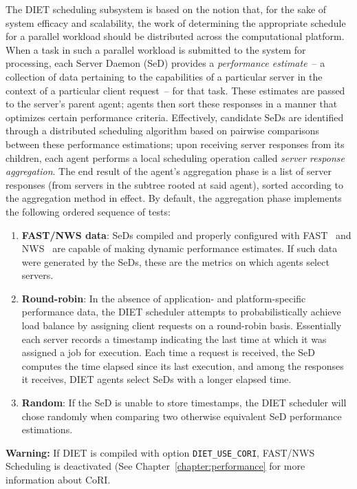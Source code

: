 The DIET scheduling subsystem is based on the notion that, for the
sake of system efficacy and scalability, the work of
determining the appropriate schedule for a parallel workload should be
distributed across the computational platform.  When a task in
such a parallel workload is submitted to the system for processing,
each Server Daemon (SeD) provides a
\emph{performance estimate}~-- a collection of data pertaining to
the capabilities of a particular server in the context of a particular
client request~-- for that task.  These estimates are
passed to the server's parent agent; agents then
sort these responses in a manner that optimizes certain performance
criteria.
Effectively, candidate SeDs are identified through a distributed
scheduling algorithm based on
pairwise comparisons between these
performance estimations; upon receiving server responses from its
children, each agent performs a local scheduling operation called
\emph{server response aggregation}.  The end result of the agent's
aggregation phase is a list of server responses (from servers in the
subtree rooted at said agent), sorted according to the
aggregation method in effect.
By default, the aggregation phase
implements the following ordered sequence of tests:

\begin{enumerate}
\item \textbf{FAST/NWS data}: SeDs compiled and properly configured with
  FAST~\cite{Qui02} and
  NWS~\cite{WSH99}
  are capable of making dynamic
  performance estimates.  If such data
  were generated by the SeDs, these are the metrics on which agents
  select servers.
\item \textbf{Round-robin}: In the absence of application- and
  platform-specific performance
  data, the DIET scheduler attempts to probabilistically achieve load
  balance by assigning client requests on a round-robin
  basis.  Essentially each server records a timestamp indicating the
  last time at which it was assigned a job for execution.  Each time a
  request is received, the SeD computes the time elapsed since its
  last execution, and among the responses it receives, DIET agents
  select SeDs with a longer elapsed time.
\item \textbf{Random}: If the SeD is unable to store
  timestamps, the DIET scheduler will chose randomly when
  comparing two otherwise equivalent SeD performance estimations.
\end{enumerate}

\textbf{Warning:} If DIET is compiled with option \texttt{DIET\_USE\_CORI},
FAST/NWS Scheduling is deactivated (See
Chapter~\ref{chapter:performance} for more information about CoRI.

